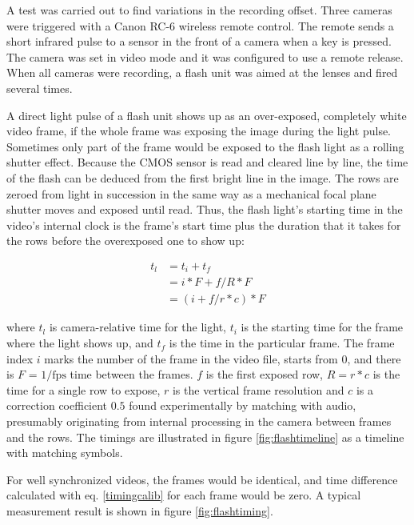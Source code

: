 A test was carried out to find variations in the recording offset.
Three cameras were triggered with a Canon RC-6 wireless remote control.
The remote sends a short infrared pulse to a sensor in the front of a camera when a key is pressed.
The camera was set in video mode and it was configured to use a remote release.
When all cameras were recording, a flash unit was aimed at the lenses and fired several times.

A direct light pulse of a flash unit shows up as an over-exposed, completely white video frame, if the whole frame was exposing the image during the light pulse.
Sometimes only part of the frame would be exposed to the flash light as a rolling shutter effect.
Because the CMOS sensor is read and cleared line by line, the time of the flash can be deduced from the first bright line in the image.
The rows are zeroed from light in succession in the same way as a mechanical focal plane shutter moves and exposed until read.
Thus, the flash light's starting time in the video's internal clock is the frame's start time plus the duration that it takes for the rows before the overexposed one to show up:

\begin{align} \label{timingcalib}
t_l &= t_i + t_f \\
&= i * F + f / R * F \\
&= (i + f / r * c) * F
\end{align}

where $t_l$ is camera-relative time for the light, $t_i$ is the starting time for the frame where the light shows up, and $t_f$ is the time in the particular frame.
The frame index $i$ marks the number of the frame in the video file, starts from 0, and there is $F$ = $1/\text{fps}$ time between the frames.
$f$ is the first exposed row, $R = r * c$ is the time for a single row to expose, $r$ is the vertical frame resolution and $c$ is a correction coefficient $0.5$ found experimentally by matching with audio, presumably originating from internal processing in the camera between frames and the rows.
The timings are illustrated in figure \ref{fig:flashtimeline} as a timeline with matching symbols.

For well synchronized videos, the frames would be identical, and time difference calculated with eq. \ref{timingcalib} for each frame would be zero.
A typical measurement result is shown in figure \ref{fig:flashtiming}.


